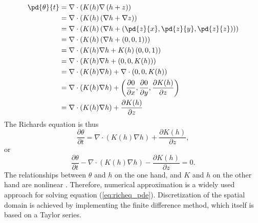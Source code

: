 \begin{align*}
  \pd{\theta}{t} &= \nabla \cdot \left( K(h) \nabla \left( h + z \right) \right) \\
                                     &= \nabla \cdot\left( K(h) \left(\nabla h + \nabla z \right) \right) \\
                                     &= \nabla \cdot\left( K(h) \left(\nabla h + \left(\pd{z}{x},\pd{z}{y},\pd{z}{z} \right) \right) \right) \\
                                     &= \nabla \cdot\left( K(h) \left(\nabla h + \left(0,0,1 \right) \right) \right) \\
                                     &= \nabla \cdot \left(K(h) \nabla h + K(h) \left(0,0,1 \right) \right) \\
                                     &= \nabla \cdot \left(K(h) \nabla h + \left(0,0,K(h) \right) \right) \\
                                     &= \nabla \cdot \left( K(h) \nabla h \right) + \nabla \cdot \left(0,0,K(h) \right) \\
                                     &= \nabla \cdot \left( K(h) \nabla h \right) + \left(\frac{\partial 0}{\partial x},\frac{\partial 0}{\partial y},\frac{\partial K(h)}{\partial z} \right) \\
                                     &= \nabla \cdot \left( K(h) \nabla h \right) + \frac{\partial K(h)}{\partial z}
\end{align*}
The Richards equation is thus
\begin{equation}
  \label{eq:richeq_simple}
  \frac{\partial \theta}{\partial t} = \nabla \cdot \left( K(h) \nabla h \right) + \frac{\partial K(h)}{\partial z},
\end{equation}
or
\begin{equation}
  \label{eq:richeq_pde}
  \frac{\partial \theta}{\partial t} - \nabla \cdot \left( K(h) \nabla h \right) - \frac{\partial K(h)}{\partial z} = 0 .
\end{equation}
The relationships between $\theta$ and $h$ on the one hand, and $K$ and $h$ on the other hand are nonlinear \parencite{celia_general_1990}.  Therefore, numerical approximation is a widely used approach for solving equation (\ref{eq:richeq_pde}).  Discretization of the spatial domain is achieved by implementing the finite difference method, which itself is based on a Taylor series.

